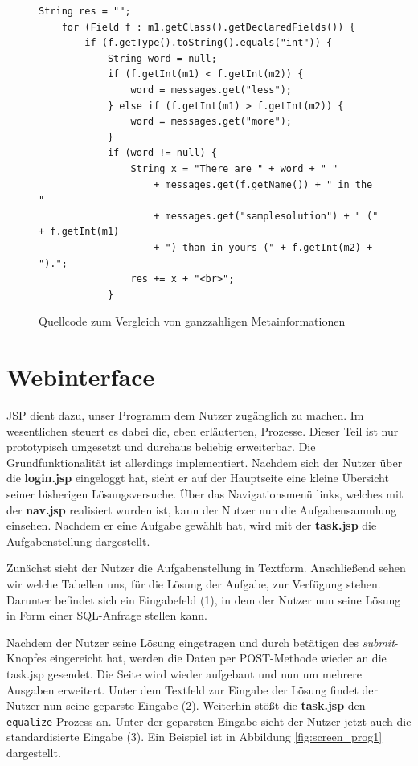 \begin{figure}[h]
\lstset{language=Java,tabsize=2}
\begin{lstlisting}
String res = "";
	for (Field f : m1.getClass().getDeclaredFields()) {
		if (f.getType().toString().equals("int")) {
			String word = null;
			if (f.getInt(m1) < f.getInt(m2)) {
				word = messages.get("less");
			} else if (f.getInt(m1) > f.getInt(m2)) {
				word = messages.get("more");
			}
			if (word != null) {
				String x = "There are " + word + " "
					+ messages.get(f.getName()) + " in the "
					+ messages.get("samplesolution") + " (" + f.getInt(m1)
					+ ") than in yours (" + f.getInt(m2) + ").";
				res += x + "<br>";
			}
\end{lstlisting}
\caption{Quellcode zum Vergleich von ganzzahligen Metainformationen}
\label{fig:comparecode}
\end{figure}

\section{Webinterface}

JSP dient dazu, unser Programm dem Nutzer zugänglich zu machen. Im wesentlichen steuert es dabei die, eben erläuterten, Prozesse. Dieser Teil ist nur prototypisch umgesetzt und durchaus beliebig erweiterbar. Die Grundfunktionalität ist allerdings implementiert. Nachdem sich der Nutzer über die \textbf{login.jsp} eingeloggt hat, sieht er auf der Hauptseite eine kleine Übersicht seiner bisherigen Lösungsversuche. Über das Navigationsmenü links, welches mit der \textbf{nav.jsp} realisiert wurden ist, kann der Nutzer nun die Aufgabensammlung einsehen. Nachdem er eine Aufgabe gewählt hat, wird mit der \textbf{task.jsp} die Aufgabenstellung dargestellt.

Zunächst sieht der Nutzer die Aufgabenstellung in Textform. Anschließend sehen wir welche Tabellen uns, für die Lösung der Aufgabe, zur Verfügung stehen. Darunter befindet sich ein Eingabefeld (1), in dem der Nutzer nun seine Lösung in Form einer SQL-Anfrage stellen kann.

Nachdem der Nutzer seine Lösung eingetragen und durch betätigen des \textit{submit}-Knopfes eingereicht hat, werden die Daten per POST-Methode wieder an die task.jsp gesendet. Die Seite wird wieder aufgebaut und nun um mehrere Ausgaben erweitert. Unter dem Textfeld zur Eingabe der Lösung findet der Nutzer nun seine geparste Eingabe (2). Weiterhin stößt die \textbf{task.jsp} den \verb|equalize| Prozess an. Unter der geparsten Eingabe sieht der Nutzer jetzt auch die standardisierte Eingabe (3). Ein Beispiel ist in Abbildung \ref{fig:screen_prog1} dargestellt.

